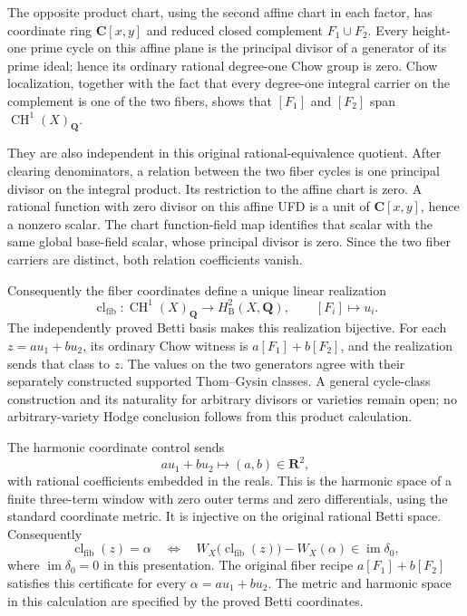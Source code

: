 \documentclass[11pt]{article}
\theoremstyle{definition}
\theoremstyle{remark}
\DeclareMathOperator{\CH}{CH}
\newcommand{\Q}{\mathbf Q}
\begin{document}
The opposite product chart, using the second affine chart in each factor,
has coordinate ring \(\mathbf C[x,y]\) and reduced closed complement
\(F_1\cup F_2\). Every height-one prime cycle on this affine plane is the
principal divisor of a generator of its prime ideal; hence its ordinary
rational degree-one Chow group is zero. Chow localization, together with
the fact that every degree-one integral carrier on the complement is one
of the two fibers, shows that \([F_1]\) and \([F_2]\) span
\(\CH^1(X)_{\Q}\).

They are also independent in this original rational-equivalence quotient.
After clearing denominators, a relation between the two fiber cycles is
one principal divisor on the integral product. Its restriction to the
affine chart is zero. A rational function with zero divisor on this
affine UFD is a unit of \(\mathbf C[x,y]\), hence a nonzero scalar. The
chart function-field map identifies that scalar with the same global
base-field scalar, whose principal divisor is zero. Since the two fiber
carriers are distinct, both relation coefficients vanish.

Consequently the fiber coordinates define a unique linear realization
\[
  \operatorname{cl}_{\mathrm{fib}}:\CH^1(X)_{\Q}
     \longrightarrow H^2_{\mathrm B}(X,\Q),
  \qquad [F_i]\longmapsto u_i.
\]
The independently proved Betti basis makes this realization bijective.
For each \(z=a u_1+b u_2\), its ordinary Chow witness is
\(a[F_1]+b[F_2]\), and the realization sends that class to \(z\).
The values on the two generators agree with their separately constructed
supported Thom--Gysin classes. A general cycle-class construction and
its naturality for arbitrary divisors or varieties remain open; no
arbitrary-variety Hodge conclusion follows from this product calculation.

The harmonic coordinate control sends
\[
 a u_1+b u_2\longmapsto(a,b)\in\mathbf R^2,
\]
with rational coefficients embedded in the reals. This is the harmonic space
of a finite three-term window with zero outer terms and zero differentials,
using the standard coordinate metric. It is injective on the original
rational Betti space. Consequently
\[
 \operatorname{cl}_{\mathrm{fib}}(z)=\alpha
 \quad\Longleftrightarrow\quad
 W_X\bigl(\operatorname{cl}_{\mathrm{fib}}(z)\bigr)-W_X(\alpha)
       \in\operatorname{im}\delta_0,
\]
where \(\operatorname{im}\delta_0=0\) in this presentation. The original
fiber recipe \(a[F_1]+b[F_2]\) satisfies this certificate for every
\(\alpha=a u_1+b u_2\). The metric and harmonic space in this calculation
are specified by the proved Betti coordinates.
\end{document}
